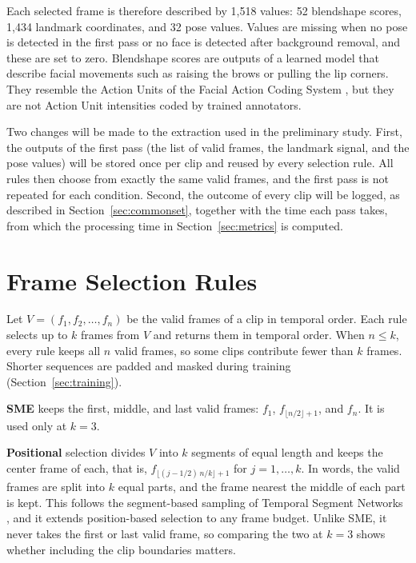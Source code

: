 Each selected frame is therefore described by 1,518 values: 52 blendshape scores, 1,434 landmark coordinates, and 32 pose values. Values are missing when no pose is detected in the first pass or no face is detected after background removal, and these are set to zero. Blendshape scores are outputs of a learned model that describe facial movements such as raising the brows or pulling the lip corners. They resemble the Action Units of the Facial Action Coding System \cite{ekman1978}, but they are not Action Unit intensities coded by trained annotators.

Two changes will be made to the extraction used in the preliminary study. First, the outputs of the first pass (the list of valid frames, the landmark signal, and the pose values) will be stored once per clip and reused by every selection rule. All rules then choose from exactly the same valid frames, and the first pass is not repeated for each condition. Second, the outcome of every clip will be logged, as described in Section~\ref{sec:commonset}, together with the time each pass takes, from which the processing time in Section~\ref{sec:metrics} is computed.



\section{Frame Selection Rules}
\label{sec:selection}

Let $V = (f_1, f_2, \dots, f_n)$ be the valid frames of a clip in temporal order. Each rule selects up to $k$ frames from $V$ and returns them in temporal order. When $n \le k$, every rule keeps all $n$ valid frames, so some clips contribute fewer than $k$ frames. Shorter sequences are padded and masked during training (Section~\ref{sec:training}).

\textbf{SME} keeps the first, middle, and last valid frames: $f_1$, $f_{\lfloor n/2 \rfloor + 1}$, and $f_n$. It is used only at $k = 3$.

\textbf{Positional} selection divides $V$ into $k$ segments of equal length and keeps the center frame of each, that is, $f_{\lfloor (j - 1/2)\,n/k \rfloor + 1}$ for $j = 1, \dots, k$. In words, the valid frames are split into $k$ equal parts, and the frame nearest the middle of each part is kept. This follows the segment-based sampling of Temporal Segment Networks \cite{wang2016}, and it extends position-based selection to any frame budget. Unlike SME, it never takes the first or last valid frame, so comparing the two at $k = 3$ shows whether including the clip boundaries matters.

